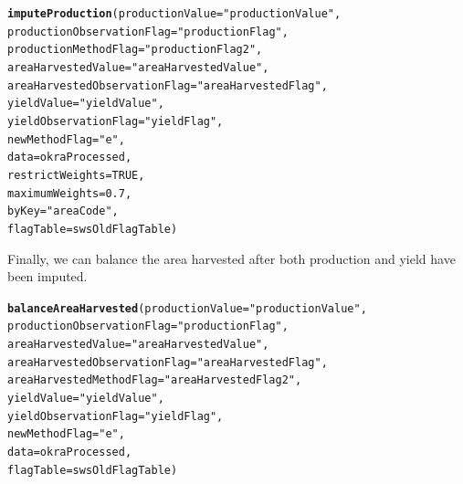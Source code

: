 \documentclass[nojss]{jss}\usepackage[]{graphicx}\usepackage[]{color}
\makeatletter
\newcommand{\hlnum}[1]{\textcolor[rgb]{0.686,0.059,0.569}{#1}}%
\newcommand{\hlstr}[1]{\textcolor[rgb]{0.192,0.494,0.8}{#1}}%
\newcommand{\hlstd}[1]{\textcolor[rgb]{0.345,0.345,0.345}{#1}}%
\newcommand{\hlkwc}[1]{\textcolor[rgb]{0.333,0.667,0.333}{#1}}%
\newcommand{\hlkwd}[1]{\textcolor[rgb]{0.737,0.353,0.396}{\textbf{#1}}}%
\newenvironment{kframe}{%
 \def\at@end@of@kframe{}%
 \ifinner\ifhmode%
  \def\at@end@of@kframe{\end{minipage}}%
  \begin{minipage}{\columnwidth}%
 \fi\fi%
 \def\FrameCommand##1{\hskip\@totalleftmargin \hskip-\fboxsep
 \colorbox{shadecolor}{##1}\hskip-\fboxsep
     \hskip-\linewidth \hskip-\@totalleftmargin \hskip\columnwidth}%
 \MakeFramed {\advance\hsize-\width
   \@totalleftmargin\z@ \linewidth\hsize
   \@setminipage}}%
 {\par\unskip\endMakeFramed%
 \at@end@of@kframe}
\newenvironment{knitrout}{}{} %
\makeatother
\begin{document}
\begin{knitrout}
\color{fgcolor}\begin{kframe}
\begin{alltt}
\hlkwd{imputeProduction}\hlstd{(}\hlkwc{productionValue} \hlstd{=} \hlstr{"productionValue"}\hlstd{,}
                 \hlkwc{productionObservationFlag} \hlstd{=} \hlstr{"productionFlag"}\hlstd{,}
                 \hlkwc{productionMethodFlag} \hlstd{=} \hlstr{"productionFlag2"}\hlstd{,}
                 \hlkwc{areaHarvestedValue} \hlstd{=} \hlstr{"areaHarvestedValue"}\hlstd{,}
                 \hlkwc{areaHarvestedObservationFlag} \hlstd{=} \hlstr{"areaHarvestedFlag"}\hlstd{,}
                 \hlkwc{yieldValue} \hlstd{=} \hlstr{"yieldValue"}\hlstd{,}
                 \hlkwc{yieldObservationFlag} \hlstd{=} \hlstr{"yieldFlag"}\hlstd{,}
                 \hlkwc{newMethodFlag} \hlstd{=} \hlstr{"e"}\hlstd{,}
                 \hlkwc{data} \hlstd{= okraProcessed,}
                 \hlkwc{restrictWeights} \hlstd{=} \hlnum{TRUE}\hlstd{,}
                 \hlkwc{maximumWeights} \hlstd{=} \hlnum{0.7}\hlstd{,}
                 \hlkwc{byKey} \hlstd{=} \hlstr{"areaCode"}\hlstd{,}
                 \hlkwc{flagTable} \hlstd{= swsOldFlagTable)}
\end{alltt}
\end{kframe}
\end{knitrout}


Finally, we can balance the area harvested after both production and
yield have been imputed.

\begin{knitrout}
\color{fgcolor}\begin{kframe}
\begin{alltt}
\hlkwd{balanceAreaHarvested}\hlstd{(}\hlkwc{productionValue} \hlstd{=} \hlstr{"productionValue"}\hlstd{,}
                     \hlkwc{productionObservationFlag} \hlstd{=} \hlstr{"productionFlag"}\hlstd{,}
                     \hlkwc{areaHarvestedValue} \hlstd{=} \hlstr{"areaHarvestedValue"}\hlstd{,}
                     \hlkwc{areaHarvestedObservationFlag} \hlstd{=} \hlstr{"areaHarvestedFlag"}\hlstd{,}
                     \hlkwc{areaHarvestedMethodFlag} \hlstd{=} \hlstr{"areaHarvestedFlag2"}\hlstd{,}
                     \hlkwc{yieldValue} \hlstd{=} \hlstr{"yieldValue"}\hlstd{,}
                     \hlkwc{yieldObservationFlag} \hlstd{=} \hlstr{"yieldFlag"}\hlstd{,}
                     \hlkwc{newMethodFlag} \hlstd{=} \hlstr{"e"}\hlstd{,}
                     \hlkwc{data} \hlstd{= okraProcessed,}
                     \hlkwc{flagTable} \hlstd{= swsOldFlagTable)}
\end{alltt}
\end{kframe}
\end{knitrout}
\end{document}
